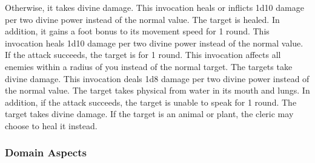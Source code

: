            Otherwise, it takes divine damage.
            This invocation heals or inflicts 1d10 damage per two divine power instead of the normal value.
            The target is healed.
            In addition, it gains a  foot bonus to its movement speed for 1 round.
            This invocation heals 1d10 damage per two divine power instead of the normal value.
            If the attack succeeds, the target is \disoriented for 1 round.
            This invocation affects all enemies within a \areasmall radius of you instead of the normal target.
            The targets take divine damage.
            This invocation deals 1d8 damage per two divine power instead of the normal value.
            The target takes physical  from water in its mouth and lungs.
            In addition, if the attack succeeds, the target is unable to speak for 1 round.
            The target takes divine damage.
            If the target is an animal or plant, the cleric may choose to heal it instead.

        \subsubsection{Domain Aspects}\label{Domain Aspects}

